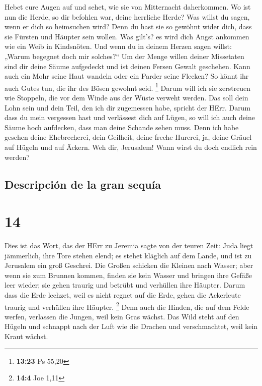  Hebet eure Augen auf und sehet, wie sie von Mitternacht
daherkommen. Wo ist nun die Herde, so dir befohlen war, deine herrliche
Herde?  Was willst du sagen, wenn er dich so heimsuchen
wird? Denn du hast sie so gewöhnt wider dich, dass sie Fürsten und
Häupter sein wollen. Was gilt's? es wird dich Angst ankommen wie ein
Weib in Kindsnöten.  Und wenn du in deinem Herzen sagen
willst: „Warum begegnet doch mir solches?{}`` Um der Menge willen deiner
Missetaten sind dir deine Säume aufgedeckt und ist deinen Fersen Gewalt
geschehen.  Kann auch ein Mohr seine Haut wandeln oder
ein Parder seine Flecken? So könnt ihr auch Gutes tun, die ihr des Bösen
gewohnt seid. \footnote{\textbf{13:23} Ps 55,20}  Darum
will ich sie zerstreuen wie Stoppeln, die vor dem Winde aus der Wüste
verweht werden.  Das soll dein Lohn sein und dein Teil,
den ich dir zugemessen habe, spricht der HErr. Darum dass du mein
vergessen hast und verlässest dich auf Lügen,  so will
ich auch deine Säume hoch aufdecken, dass man deine Schande sehen muss.
 Denn ich habe gesehen deine Ehebrecherei, dein Geilheit,
deine freche Hurerei, ja, deine Gräuel auf Hügeln und auf Äckern. Weh
dir, Jerusalem! Wann wirst du doch endlich rein werden?

\hypertarget{descripciuxf3n-de-la-gran-sequuxeda}{%
\subsection{Descripción de la gran
sequía}\label{descripciuxf3n-de-la-gran-sequuxeda}}

\hypertarget{section-13}{%
\section{14}\label{section-13}}

 Dies ist das Wort, das der HErr zu Jeremia sagte von der
teuren Zeit:  Juda liegt jämmerlich, ihre Tore stehen
elend; es stehet kläglich auf dem Lande, und ist zu Jerusalem ein groß
Geschrei.  Die Großen schicken die Kleinen nach Wasser;
aber wenn sie zum Brunnen kommen, finden sie kein Wasser und bringen
ihre Gefäße leer wieder; sie gehen traurig und betrübt und verhüllen
ihre Häupter.  Darum dass die Erde lechzet, weil es nicht
regnet auf die Erde, gehen die Ackerleute traurig und verhüllen ihre
Häupter. \footnote{\textbf{14:4} Joe 1,11}  Denn auch die
Hinden, die auf dem Felde werfen, verlassen die Jungen, weil kein Gras
wächst.  Das Wild steht auf den Hügeln und schnappt nach
der Luft wie die Drachen und verschmachtet, weil kein Kraut wächst.

